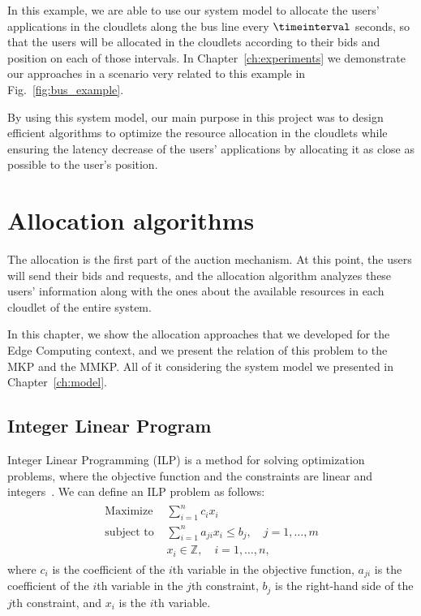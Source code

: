 \documentclass[English]{ic-tese-v3}
\begin{document}
In this example, we are able to use our system model to allocate the users' applications in the cloudlets along the bus line every $\timeinterval$ seconds, so that the users will be allocated in the cloudlets according to their bids and position on each of those intervals. In Chapter~\ref{ch:experiments} we demonstrate our approaches in a scenario  very related to this example in Fig.~\ref{fig:bus_example}.

By using this system model, our main purpose in this project was to design efficient algorithms to optimize the resource allocation in the cloudlets while ensuring the latency decrease of the users' applications by allocating it as close as possible to the user's position.

\chapter{Allocation algorithms}
\label{ch:alloc}
The allocation is the first part of the auction mechanism. At this point, the users will send their bids and requests, and the allocation algorithm analyzes these users' information along with the ones about the available resources in each cloudlet of the entire system.

In this chapter, we show the allocation approaches that we developed for the Edge Computing context, and we present the relation of this problem to the MKP and the MMKP. All of it considering the system model we presented in Chapter~\ref{ch:model}. 

\section{Integer Linear Program}
\label{sec:ilp}
Integer Linear Programming (ILP) is a method for solving optimization problems, where the objective function and the constraints are linear and integers~\cite{HillLieb01}. We can define an ILP problem as follows:
\begin{align*}
\label{eq:ilp}
    \begin{split}
    \text{Maximize } & \sum_{i=1}^{n} c_i x_i \\
    \text{subject to } & \sum_{i=1}^{n} a_{ji} x_i \leq b_j, \quad j = 1, \ldots, m \\
    & x_i \in \mathbb{Z}, \quad i = 1, \ldots, n,
    \end{split}
\end{align*}
where $c_i$ is the coefficient of the $i$th variable in the objective function, $a_{ji}$ is the coefficient of the $i$th variable in the $j$th constraint, $b_j$ is the right-hand side of the $j$th constraint, and $x_i$ is the $i$th variable. 
\end{document}
